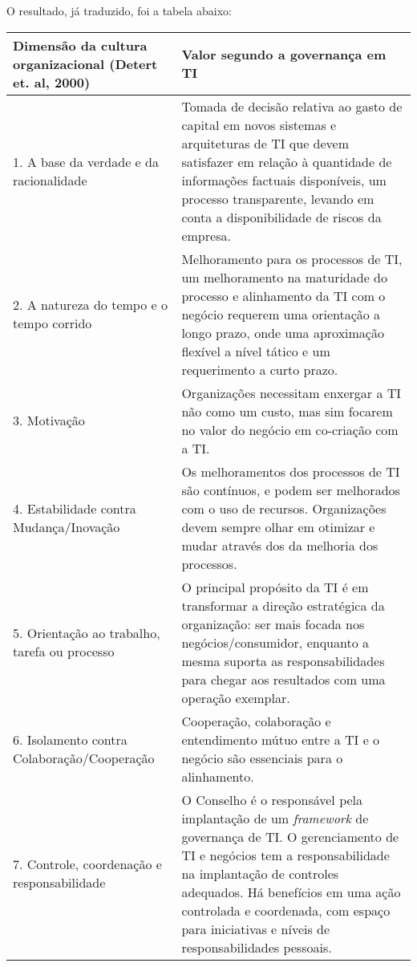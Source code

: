 O resultado, já traduzido, foi a tabela abaixo:

\begin{center}

    \begin{tabular}{|p{5cm}|p{11cm}|}
        \hline
        {\bf Dimensão da cultura organizacional (Detert et. al, 2000)} & {\bf Valor segundo a governança em TI}  \\ \hline
        1. A base da verdade e da racionalidade & Tomada de decisão relativa ao gasto de capital em novos sistemas e arquiteturas de TI que devem satisfazer em relação à quantidade de informações factuais disponíveis, um processo transparente, levando em conta a disponibilidade de riscos da empresa. \\ \hline
        
        2. A natureza do tempo e o tempo corrido & Melhoramento para os processos de TI, um melhoramento na maturidade do processo e alinhamento da TI com o negócio requerem uma orientação a longo prazo, onde uma aproximação flexível a nível tático e um requerimento a curto prazo. \\ 
        \hline
        
        3. Motivação & Organizações necessitam enxergar a TI não como um custo, mas sim focarem no valor do negócio em co-criação com a TI. \\
        \hline
        
        4. Estabilidade contra Mudança/Inovação & Os melhoramentos dos processos de TI são contínuos, e podem ser melhorados com o uso de recursos. Organizações devem sempre olhar em otimizar e mudar através dos da melhoria dos processos. \\
        \hline
        
        5. Orientação ao trabalho, tarefa ou processo & O principal propósito da TI é em transformar a direção estratégica da organização: ser mais focada nos negócios/consumidor, enquanto a mesma suporta as responsabilidades para chegar aos resultados com uma operação exemplar. \\ \hline
        
        6. Isolamento contra Colaboração/Cooperação & Cooperação, colaboração e entendimento mútuo entre a TI e o negócio são essenciais para o alinhamento. \\
        \hline
        
        7. Controle, coordenação e responsabilidade & O Conselho é o responsável pela implantação de um {\it framework} de governança de TI. O gerenciamento de TI e negócios tem a responsabilidade na implantação de controles adequados. Há benefícios em uma ação controlada e coordenada, com espaço para iniciativas e níveis de responsabilidades pessoais. \\
        \hline
        

\end{tabular}
\end{center}
